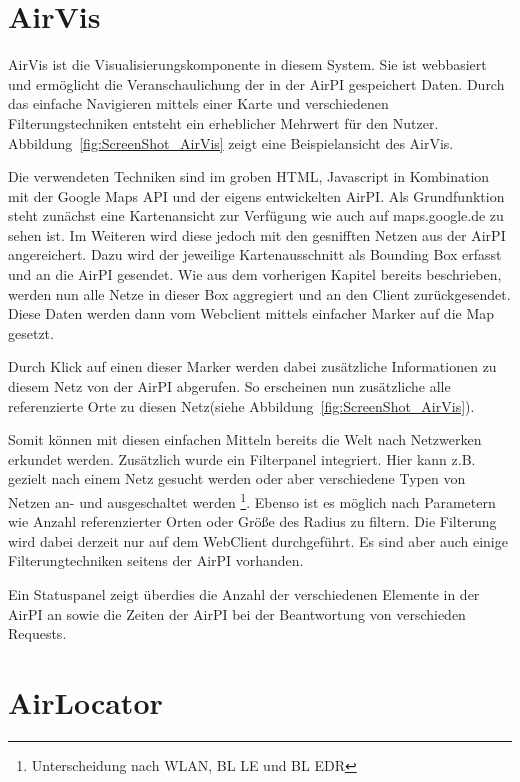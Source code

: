 \documentclass[11pt,a4paper]{article}
\begin{document}

\section{AirVis}

AirVis ist die Visualisierungskomponente in diesem System. Sie ist webbasiert und ermöglicht die Veranschaulichung der in der AirPI gespeichert Daten. Durch das einfache Navigieren mittels einer Karte und verschiedenen Filterungstechniken entsteht ein erheblicher Mehrwert für den Nutzer. Abbildung~\ref{fig:ScreenShot_AirVis} zeigt eine Beispielansicht des AirVis.

Die verwendeten Techniken sind im groben HTML, Javascript in Kombination mit der Google Maps API und der eigens entwickelten AirPI. Als Grundfunktion steht zunächst eine Kartenansicht zur Verfügung wie auch auf maps.google.de zu sehen ist. Im Weiteren wird diese jedoch mit den gesnifften Netzen aus der AirPI angereichert. Dazu wird der jeweilige Kartenausschnitt als Bounding Box erfasst und an die AirPI gesendet. Wie aus dem vorherigen Kapitel bereits beschrieben, werden nun alle Netze in dieser Box aggregiert und an den Client zurückgesendet. Diese Daten werden dann vom Webclient mittels einfacher Marker auf die Map gesetzt.

Durch Klick auf einen dieser Marker werden dabei zusätzliche Informationen zu diesem Netz von der AirPI abgerufen. So erscheinen nun zusätzliche alle referenzierte Orte zu diesen Netz(siehe Abbildung~\ref{fig:ScreenShot_AirVis}).

Somit können mit diesen einfachen Mitteln bereits die Welt nach Netzwerken erkundet werden. Zusätzlich wurde ein Filterpanel integriert. Hier kann z.B. gezielt nach einem Netz gesucht werden oder aber verschiedene Typen von Netzen an- und ausgeschaltet werden
\footnote{Unterscheidung nach WLAN, BL LE und BL EDR}.
Ebenso ist es möglich nach Parametern wie Anzahl referenzierter Orten oder Größe des Radius zu filtern. Die Filterung wird dabei derzeit nur auf dem WebClient durchgeführt. Es sind aber auch einige Filterungtechniken seitens der AirPI vorhanden.

Ein Statuspanel zeigt überdies die Anzahl der verschiedenen Elemente in der AirPI an sowie die Zeiten der AirPI bei der Beantwortung von verschieden Requests.

\section{AirLocator}
\end{document}
